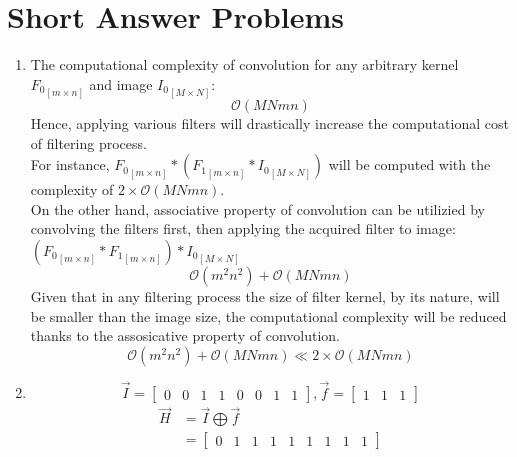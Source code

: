 \documentclass{article}
\begin{document}
\section{Short Answer Problems}
\begin{enumerate}
	\item The computational complexity of convolution for any arbitrary
	kernel ${F_0}_{[m\times n]}$ and image ${I_0}_{[M\times N]}$:
	$$\mathcal{O}(MNmn)$$
	Hence, applying various filters will drastically increase
	the computational cost of filtering process.\\
	For instance, ${F_0}_{[m\times n]} \ast ({F_1}_{[m\times n]} \ast
	{I_0}_{[M\times N]})$ will be computed with the complexity of $2 \times
	\mathcal{O}(MNmn)$. \\
	On the other hand, associative property of convolution can be
	utilizied by convolving the filters first, then applying the acquired filter to
	image:
	$({F_0}_{[m\times n]} \ast {F_1}_{[m\times n]}) \ast
	{I_0}_{[M\times N]}$ $$\mathcal{O}(m^2n^2) + \mathcal{O}(MNmn)$$
	Given that in any filtering process the size of filter
	kernel, by its nature, will be smaller than the image size, the computational
	complexity will be reduced thanks to the assosicative property of convolution.
	$$\mathcal{O}{(m^2n^2)} + \mathcal{O}(MNmn) \ll 2 \times \mathcal{O}(MNmn)$$
	\item 
	$$\vec{I} = \begin{bmatrix} 0 & 0 & 1 & 1 & 0 & 0 & 1 & 1\end{bmatrix}
	, \vec{f}= \begin{bmatrix} 1 & 1 & 1\end{bmatrix}$$
	\begin{equation} 
	\begin{split}
	\vec{H} & = \vec{I} \bigoplus \vec{f} \\
	& = \begin{bmatrix} 0 & 1 & 1 & 1 & 1 & 1 & 1 & 1 & 1 \end{bmatrix}
	\end{split}
	\end{equation}

\end{enumerate}
\end{document}
